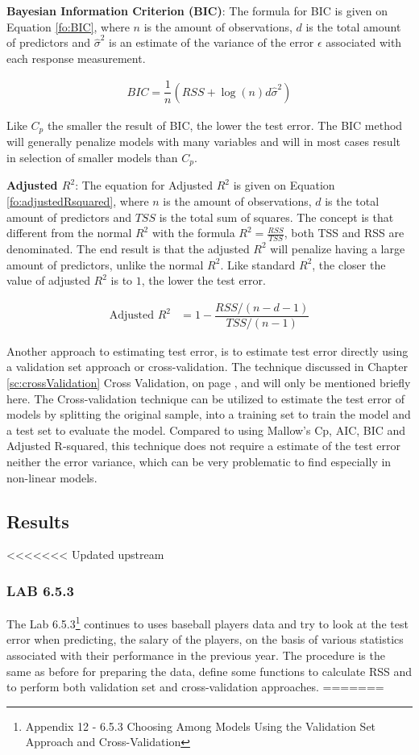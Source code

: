 \textbf{Bayesian Information Criterion (BIC)}: The formula for BIC is given on Equation \ref{fo:BIC}, where $n$ is the amount of observations, $d$ is the total amount of predictors and $\hat{\sigma}^2$ is an estimate of the variance of the error $\epsilon$ associated with each response measurement.

\begin{align}\label{fo:BIC}
BIC = \dfrac{1}{n} (RSS + \log(n) d \hat{\sigma}^2)
\end{align}

Like $C_p$ the smaller the result of BIC, the lower the test error. The BIC method will generally penalize models with many variables and will in most cases result in selection of smaller models than $C_p$.

\textbf{Adjusted $R^2$}: The equation for Adjusted $R^2$ is given on Equation \ref{fo:adjustedRsquared}, where $n$ is the amount of observations, $d$ is the total amount of predictors and $TSS$ is the total sum of squares. The concept is that different from the normal $R^2$ with the formula $R^2 = \tfrac{RSS}{TSS}$, both TSS and RSS  are denominated. The end result is that the adjusted $R^2$ will penalize having a large amount of predictors, unlike the normal $R^2$. Like standard $R^2$, the closer the value of adjusted $R^2$ is to $1$, the lower the test error.

\begin{align}\label{fo:adjustedRsquared}
	\text{Adjusted } R^2 &= 1 - \dfrac{RSS/(n-d-1)}{TSS/(n-1)}
\end{align}

Another approach to estimating test error, is to estimate test error directly using a validation set approach or cross-validation. The technique discussed in Chapter \ref{sc:crossValidation} Cross Validation, on page \pageref{sc:crossValidation}, and will only be mentioned briefly here. The Cross-validation technique can be utilized to estimate the test error of models by splitting the original sample, into a training set to train the model and a test set to evaluate the model. Compared to using Mallow's Cp, AIC, BIC and Adjusted R-squared, this technique does not require a estimate of the test error neither the error variance, which can be very problematic to find especially in non-linear models.

\subsection{Results}
<<<<<<< Updated upstream
\subsubsection*{LAB 6.5.3}
The Lab 6.5.3\footnote{Appendix 12 - 6.5.3 Choosing Among Models Using the Validation Set Approach and Cross-Validation} continues to uses baseball players data and try to look at the test error when predicting, the salary of the players, on the basis of various statistics associated with their performance in the previous year. The procedure is the same as before for preparing the data, define some functions to calculate RSS and to perform both validation set and cross-validation approaches.
=======
